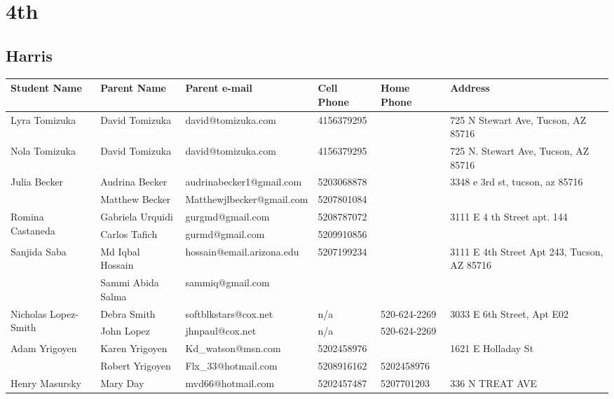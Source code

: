 \documentclass[landscape]{article}\usepackage[]{graphicx}\usepackage[]{color}
\begin{document}
\section{4th}
\subsection{Harris}
\begin{longtable}{p{70pt}|p{75pt}|p{120pt}|p{60pt}|p{60pt}|p{120pt}|}
Student Name & Parent Name & Parent e-mail & Cell Phone & Home Phone & Address\\
\hline
\multirow{2}{70pt}{Lyra Tomizuka} & David Tomizuka & david@tomizuka.com & 4156379295 &  & \multirow{2}{100pt}{725 N Stewart Ave, Tucson, AZ 85716} \\
 &  &  &  &  & \\
\hline
\multirow{2}{70pt}{Nola Tomizuka} & David Tomizuka & david@tomizuka.com & 4156379295 &  & \multirow{2}{100pt}{725 N. Stewart Ave, Tucson, AZ 85716} \\
 &  &  &  &  & \\
\hline
\multirow{2}{70pt}{Julia Becker} & Audrina Becker & audrinabecker1@gmail.com & 5203068878 &  & \multirow{2}{100pt}{3348 e 3rd st, tucson, az 85716} \\
 & Matthew Becker & Matthewjlbecker@gmail.com & 5207801084 &  & \\
\hline
\multirow{2}{70pt}{Romina Castaneda} & Gabriela Urquidi & gurgmd@gmail.com & 5208787072 &  & \multirow{2}{100pt}{3111 E 4 th Street apt. 144} \\
 & Carlos Tafich & gurmd@gmail.com & 5209910856 &  & \\
\hline
\multirow{2}{70pt}{Sanjida Saba} & Md Iqbal Hossain & hossain@email.arizona.edu & 5207199234 &  & \multirow{2}{100pt}{3111 E 4th Street Apt 243, Tucson, AZ 85716} \\
 & Sammi Abida Salma & sammiq@gmail.com &  &  & \\
\hline
\multirow{2}{70pt}{Nicholas Lopez-Smith} & Debra Smith & softblkstars@cox.net & n/a & 520-624-2269 & \multirow{2}{100pt}{3033 E 6th Street, Apt E02} \\
 & John Lopez & jhnpaul@cox.net & n/a & 520-624-2269 & \\
\hline
\multirow{2}{70pt}{Adam Yrigoyen} & Karen Yrigoyen  & Kd\_watson@msn.com & 5202458976 &  & \multirow{2}{100pt}{1621 E Holladay St} \\
 & Robert Yrigoyen & Flx\_33@hotmail.com  & 5208916162 & 5202458976 & \\
\hline
\multirow{2}{70pt}{Henry Masursky} & Mary Day & mvd66@hotmail.com & 5202457487 & 5207701203 & \multirow{2}{100pt}{336 N TREAT AVE} \\

\end{longtable}
\end{document}
